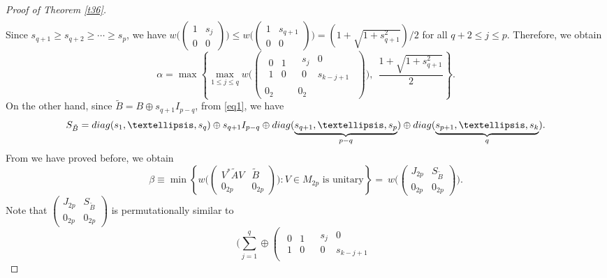 \documentclass[10pt,a4paper]{amsart}
\def\diag{{\rm diag}}
\begin{document}
\begin{proof}[Proof of Theorem \ref{t36}]
\begin{eqnarray*}
\end{eqnarray*}
Since $s_{q+1}\ge s_{q+2}\ge \cdots\ge s_p$, we have
$w\Big(\begin{pmatrix} 1 & s_{j}\\ 0 & 0\end{pmatrix}\Big) \le w\Big(\begin{pmatrix} 1 & s_{q+1}\\ 0 & 0\end{pmatrix}\Big)=(1+\sqrt{1+s_{q+1}^2})/2$ for all $q+2\le j\le p$. Therefore, we obtain
\begin{equation}\label{ee1}
\alpha=\max\left\{\max_{1\le j\le q}w\Big(\left(\begin{array}{c|c}\begin{array}{cc} 0 & 1\\ 1 & 0\end{array} & \begin{array}{cc} s_j & 0\\ 0 & s_{k-j+1}\end{array}
\\ \hline 0_2 & 0_2\end{array}\right)\Big), \ \ \frac{1+\sqrt{1+s_{q+1}^2}}{2}\right\}.
\end{equation}
On the other hand, since $\tilde{B} = B \oplus s_{q+1}I_{p-q}$, from \eqref{eq1}, we have
$$S_{\tilde{B}}=\diag(s_1, \dots, s_q)\oplus s_{q+1}I_{p-q}\oplus \diag(\underbrace{s_{q+1}, \dots, s_p}_{p-q})\oplus \diag(\underbrace{s_{p+1}, \dots, s_k}_q).$$
From we have proved before, we obtain
$$
\beta  \equiv  \min\left\{w\Big(\begin{pmatrix} V^* \tilde{A}V & \tilde{B}\\ 0_{2p} & 0_{2p}\end{pmatrix}\Big) : V\in M_{2p} \mbox{ is unitary}\right\}
=  \ w\Big(\left(\begin{array}{cc} J_{2p} & S_{\tilde{B}}
\\ 0_{2p} & 0_{2p}\end{array}\right)\Big). $$
Note that $\left(\begin{array}{cc} J_{2p} & S_{\tilde{B}}
\\ 0_{2p} & 0_{2p}\end{array}\right)$ is permutationally similar to
$$\Bigg(\sum_{j=1}^q\oplus\left(\begin{array}{c|c}\begin{array}{cc} 0 & 1\\ 1 & 0\end{array} & \begin{array}{cc} s_j & 0\\ 0 & s_{k-j+1}\end{array}

\end{array}$$
\end{proof}
\end{document}
